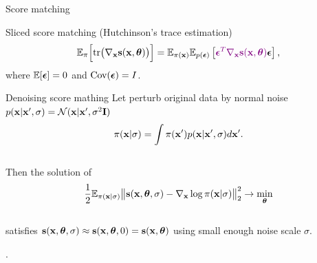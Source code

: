 \begin{frame}{Score matching}
	\vspace{-0.3cm}
	\begin{block}{Sliced score matching (Hutchinson's trace estimation)}
		\vspace{-0.3cm}
		\[
			\mathbb{E}_{\pi}\Bigr[ \text{tr}\bigl(\nabla_{\mathbf{x}} \mathbf{s}(\mathbf{x}, \boldsymbol{\theta})\bigr) \Bigr] = \mathbb{E}_{\pi(\mathbf{x})} \mathbb{E}_{p(\boldsymbol{\epsilon})} \left[ {\color{violet}\boldsymbol{\epsilon}^T \nabla_{\mathbf{x}} \mathbf{s}(\mathbf{x}, \boldsymbol{\theta})} \boldsymbol{\epsilon} \right],
		\]
		where $\mathbb{E} [\boldsymbol{\epsilon}] = 0$ and $\text{Cov} (\boldsymbol{\epsilon}) = I$.
	\end{block}
	\vspace{-0.2cm}
	\begin{block}{Denoising score mathing}
		Let perturb original data by normal noise $p(\mathbf{x} | \mathbf{x}', \sigma) = \mathcal{N}(\mathbf{x} | \mathbf{x}', \sigma^2 \mathbf{I})$
		\vspace{-0.3cm}
		\[
			\pi(\mathbf{x} | \sigma) = \int \pi(\mathbf{x}') p(\mathbf{x} | \mathbf{x}', \sigma) d\mathbf{x}'.
		\]
		\vspace{-0.6cm} \\
		Then the solution of 
		\vspace{-0.2cm}
		\[
			\frac{1}{2} \mathbb{E}_{\pi(\mathbf{x} | \sigma)}\bigl\| \mathbf{s}(\mathbf{x}, \boldsymbol{\theta}, \sigma) - \nabla_{\mathbf{x}} \log \pi(\mathbf{x} | \sigma) \bigr\|^2_2 \rightarrow \min_{\boldsymbol{\theta}}
		\]
		\vspace{-0.5cm} \\
		satisfies $\mathbf{s}(\mathbf{x}, \boldsymbol{\theta}, \sigma) \approx \mathbf{s}(\mathbf{x}, \boldsymbol{\theta}, 0) = \mathbf{s}(\mathbf{x}, \boldsymbol{\theta})$ using small enough noise scale $\sigma$.
	\end{block}
	.
\end{frame}
